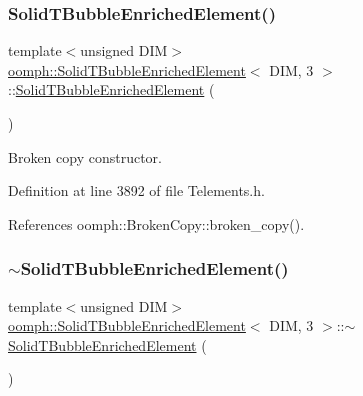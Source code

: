 \subsubsection{\texorpdfstring{Solid\+T\+Bubble\+Enriched\+Element()}{SolidTBubbleEnrichedElement()}\hspace{0.1cm}{\footnotesize\ttfamily [2/2]}}
{\footnotesize\ttfamily template$<$unsigned D\+IM$>$ \\
\hyperlink{classoomph_1_1SolidTBubbleEnrichedElement}{oomph\+::\+Solid\+T\+Bubble\+Enriched\+Element}$<$ D\+IM, 3 $>$\+::\hyperlink{classoomph_1_1SolidTBubbleEnrichedElement}{Solid\+T\+Bubble\+Enriched\+Element} (\begin{DoxyParamCaption}\item[{const \hyperlink{classoomph_1_1SolidTBubbleEnrichedElement}{Solid\+T\+Bubble\+Enriched\+Element}$<$ D\+IM, 3 $>$ \&}]{ }\end{DoxyParamCaption})\hspace{0.3cm}{\ttfamily [inline]}}



Broken copy constructor. 



Definition at line 3892 of file Telements.\+h.



References oomph\+::\+Broken\+Copy\+::broken\+\_\+copy().

\mbox{\label{classoomph_1_1SolidTBubbleEnrichedElement_3_01DIM_00_013_01_4_ad43bca4673e181c5a31cc0bb82089aa3}} 
\subsubsection{\texorpdfstring{$\sim$\+Solid\+T\+Bubble\+Enriched\+Element()}{~SolidTBubbleEnrichedElement()}}
{\footnotesize\ttfamily template$<$unsigned D\+IM$>$ \\
\hyperlink{classoomph_1_1SolidTBubbleEnrichedElement}{oomph\+::\+Solid\+T\+Bubble\+Enriched\+Element}$<$ D\+IM, 3 $>$\+::$\sim$\hyperlink{classoomph_1_1SolidTBubbleEnrichedElement}{Solid\+T\+Bubble\+Enriched\+Element} (\begin{DoxyParamCaption}{ }\end{DoxyParamCaption})\hspace{0.3cm}{\ttfamily [inline]}}



